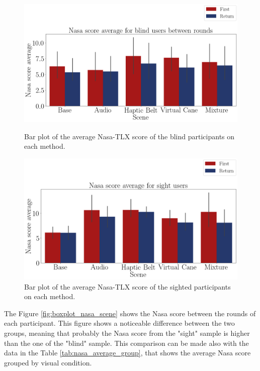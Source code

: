 

\begin{figure}[!htb]
    \centering
    \begin{minipage}{\textwidth}
        \centering
        \includegraphics[width = 0.8\linewidth]{Resultados/Nasa/Figuras/png/barplot_nasa_avg_scene_blind.png}
        \caption{Bar plot of the average Nasa-TLX score of the blind participants on each method.}
        \label{fig:barplot_nasa_scene_blind}
    \end{minipage}
    \begin{minipage}{\textwidth}
        \centering
        \includegraphics[width = 0.8\linewidth]{Resultados/Nasa/Figuras/png/barplot_nasa_avg_scene_sight.png}
        \caption{Bar plot of the average Nasa-TLX score of the sighted participants on each method.}
        \label{fig:barplot_nasa_scene_sight}
    \end{minipage}
\end{figure}


The Figure \ref{fig:boxplot_nasa_scene} shows the Nasa score between the rounds of each participant. This figure shows a noticeable difference between the two groups, meaning that probably the Nasa score from the "sight" sample is higher than the one of the "blind" sample. This comparison can be made also with the data in the Table \ref{tab:nasa_average_group}, that shows the average Nasa score grouped by visual condition.

